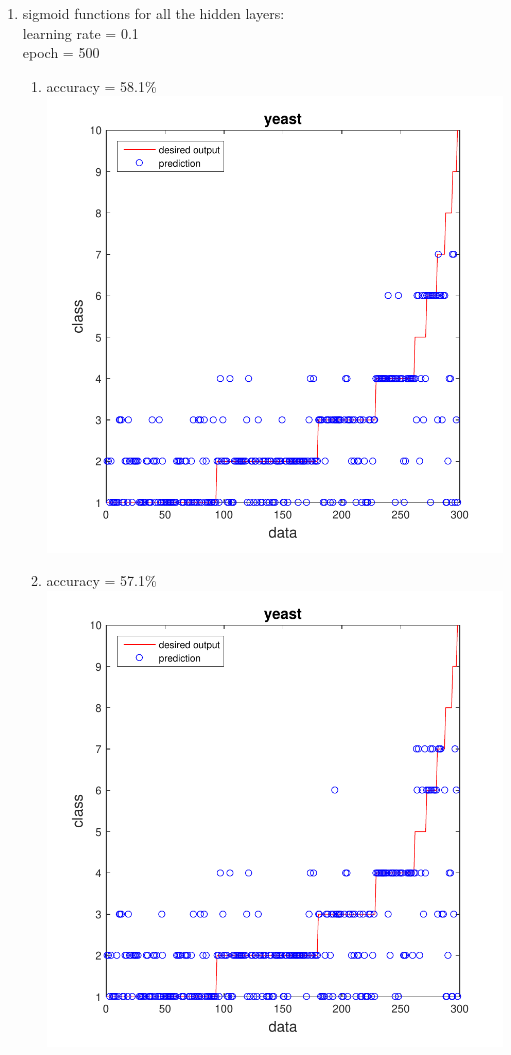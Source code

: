 \documentclass[12pt,a4paper]{article}
\begin{document}
\begin{CJK}{UTF8}{bsmi}
\begin{enumerate}
\begin{enumerate}
\begin{enumerate}
\begin{enumerate}
			\newpage	
		\end{enumerate}
		\item sigmoid functions for all the hidden layers:
		\\
		learning rate = 0.1 \\
		epoch = 500
		\begin{enumerate}
			\item accuracy = 58.1\%\ \\
			\includegraphics[scale=0.6]{yeastss1}
			\newpage	
			\item accuracy = 57.1\%\ \\
			\includegraphics[scale=0.6]{yeastss2}	

\end{enumerate}
\end{enumerate}
\end{enumerate}
\end{enumerate}
\end{CJK}
\end{document}
